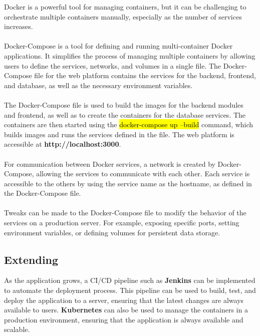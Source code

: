 \noindent Docker is a powerful tool for managing containers, but it can be challenging to orchestrate multiple containers manually, especially as the number of services increases.
\\\\
\noindent Docker-Compose is a tool for defining and running multi-container Docker applications. It simplifies the process of managing multiple containers by allowing users to define the services, networks, and volumes in a single file. The Docker-Compose file for the web platform contains the services for the backend, frontend, and database, as well as the necessary environment variables.
\\\\
\noindent The Docker-Compose file is used to build the images for the backend modules and frontend, as well as to create the containers for the database services. The containers are then started using the \hl{docker-compose up --build} command, which builds images and runs the services defined in the file. The web platform is accessible at \textbf{http://localhost:3000}.
\\\\
\noindent For communication between Docker services, a network is created by Docker-Compose, allowing the services to communicate with each other. Each service is accessible to the others by using the service name as the hostname, as defined in the Docker-Compose file.
\\\\
\noindent Tweaks can be made to the Docker-Compose file to modify the behavior of the services on a production server. For example, exposing specific ports, setting environment variables, or defining volumes for persistent data storage.

\subsection{Extending}

\noindent As the application grows, a CI/CD pipeline such as \textbf{Jenkins} can be implemented to automate the deployment process. This pipeline can be used to build, test, and deploy the application to a server, ensuring that the latest changes are always available to users. \textbf{Kubernetes} can also be used to manage the containers in a production environment, ensuring that the application is always available and scalable.